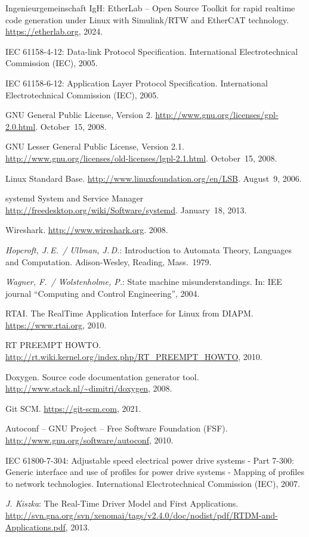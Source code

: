 \documentclass[a4paper,12pt,BCOR=6mm,bibtotoc,idxtotoc]{scrbook}
\renewcommand\nomname{Glossaire}
\begin{document}
\begin{thebibliography}{99}

 Ingenieurgemeinschaft IgH: EtherLab -- Open Source Toolkit
for rapid realtime code generation under Linux with Simulink/RTW and EtherCAT
technology. \url{https://etherlab.org}, 2024.

 IEC 61158-4-12: Data-link Protocol Specification.
International Electrotechnical Commission (IEC), 2005.

 IEC 61158-6-12: Application Layer Protocol Specification.
International Electrotechnical Commission (IEC), 2005.

 GNU General Public License, Version 2.
\url{http://www.gnu.org/licenses/gpl-2.0.html}. October~15, 2008.

 GNU Lesser General Public License, Version 2.1.
\url{http://www.gnu.org/licenses/old-licenses/lgpl-2.1.html}. October~15,
2008.

 Linux Standard Base.
\url{http://www.linuxfoundation.org/en/LSB}. August~9, 2006.

 systemd System and Service Manager
\url{http://freedesktop.org/wiki/Software/systemd}. January~18, 2013.

 Wireshark. \url{http://www.wireshark.org}. 2008.

 {\it Hopcroft, J.\,E.\ / Ullman, J.\,D.}: Introduction to
Automata Theory, Languages and Computation. Adison-Wesley, Reading,
Mass.~1979.

 {\it Wagner, F.\ / Wolstenholme, P.}: State machine
misunderstandings. In: IEE journal ``Computing and Control Engineering'',
2004.

 RTAI. The RealTime Application Interface for Linux from DIAPM.
\url{https://www.rtai.org}, 2010.

 RT PREEMPT HOWTO.
\url{http://rt.wiki.kernel.org/index.php/RT_PREEMPT_HOWTO}, 2010.

 Doxygen. Source code documentation generator tool.
\url{http://www.stack.nl/~dimitri/doxygen}, 2008.

 Git SCM. \url{https://git-scm.com}, 2021.

 Autoconf -- GNU Project -- Free Software Foundation (FSF).
\url{http://www.gnu.org/software/autoconf}, 2010.

 IEC 61800-7-304: Adjustable speed electrical power drive
systems - Part 7-300: Generic interface and use of profiles for power drive
systems - Mapping of profiles to network technologies. International
Electrotechnical Commission (IEC), 2007.

 {\it J. Kiszka}: The Real-Time Driver Model and First
Applications.
\url{http://svn.gna.org/svn/xenomai/tags/v2.4.0/doc/nodist/pdf/RTDM-and-Applications.pdf},
2013.

\end{thebibliography}

\printnomenclature
\addcontentsline{toc}{chapter}{\nomname}
\markleft{\nomname}

\printindex
{}

\end{document}
